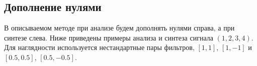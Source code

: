 \documentclass[oneside, final, 14pt]{article}
\begin{document}
\subsection{Дополнение нулями}
В описываемом методе при анализе будем дополнять нулями справа, а при синтезе слева. Ниже приведены примеры анализа и синтеза сигнала $(1,2,3,4)$. Для наглядности используется нестандартные пары фильтров, $[1,1]$, $[1,-1]$ и $[0.5,0.5]$, $[0.5,-0.5]$.
\begin{center}
\end{center}
\end{document}
